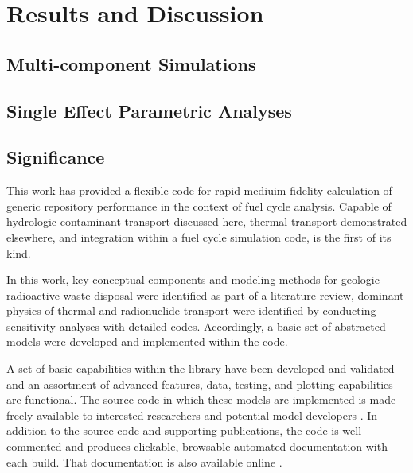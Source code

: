 \section{Results and Discussion}

\subsection{Multi-component Simulations}




\subsection{Single Effect Parametric Analyses}


\FloatBarrier
\subsection{Significance}

This work has provided a flexible code for rapid mediuim fidelity calculation
of generic repository performance in the context of fuel cycle analysis.
Capable of hydrologic contaminant transport discussed here, thermal transport
demonstrated elsewhere, and integration within a fuel cycle simulation code,
\Cyder is the first of its kind.

In this work, key conceptual components and modeling methods for geologic
radioactive waste disposal were identified as part of a literature review,
dominant physics of thermal and radionuclide transport were identified by
conducting sensitivity analyses with detailed codes. Accordingly, a basic set
of abstracted models were developed and implemented within the \Cyder code.

A set of basic capabilities within the \Cyder library have been developed and
validated and an assortment of advanced features, data, testing, and plotting
capabilities are functional. The \Cyder source code in which these models are
implemented is made freely available to interested researchers and potential
model developers \cite{huff_cyder_2013}. In addition to the source code and
supporting publications, the \Cyder code is well commented and produces
clickable, browsable automated documentation with each build. That
documentation is also available online \cite{huff_cyder_2013}.

